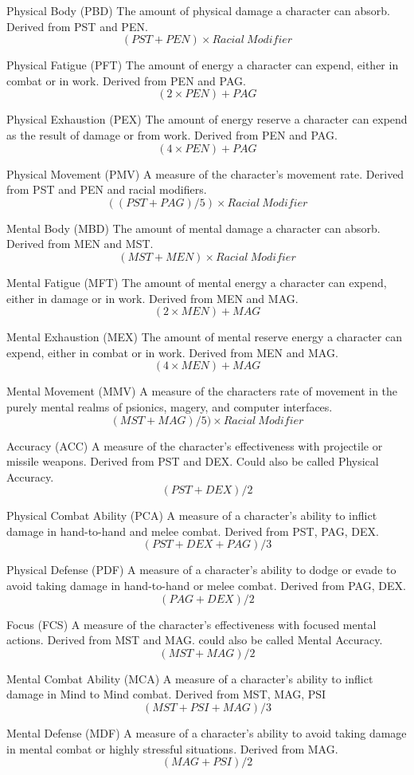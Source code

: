 \begin{relate}
	\item[Physical Body (PBD)]
	The amount of physical damage a character can absorb. Derived from PST
	and PEN.
	\[(PST+PEN) \times {Racial\ Modifier}\]
	\item[Physical Fatigue (PFT)]
	The amount of energy a character can expend, either in combat or in
	work. Derived from PEN and PAG.
	\[(2 \times PEN)+PAG\]
	\item[Physical Exhaustion (PEX)]
	The amount of energy reserve a character can expend as the result of
	damage or from work. Derived from PEN and PAG.
	\[(4 \times PEN)+PAG\]
	\item[Physical Movement (PMV)]
	A measure of the character's movement rate. Derived from PST and 
	PEN and	racial modifiers.
	\[((PST+PAG)/5) \times {Racial\ Modifier}\]
	\item[Mental Body (MBD)]
	The amount of mental damage a character can absorb. Derived from MEN and MST.
	\[(MST+MEN) \times {Racial\ Modifier}\]
	\item[Mental Fatigue (MFT)]
	The amount of mental energy a character can expend, either in damage
	or in work. Derived from MEN and MAG.
	\[(2 \times MEN)+MAG\]
	\item[Mental Exhaustion (MEX)]
	The amount of mental reserve energy a character can expend, either in combat
	or in work. Derived from MEN and MAG.
	\[(4 \times MEN)+MAG\]
	\item[Mental Movement (MMV)]
	A measure of the characters rate of movement in the purely mental
	realms of psionics, magery, and computer interfaces.
	\[(MST+MAG)/5)\times {Racial\ Modifier}\]
	\item[Accuracy (ACC)]
	A measure of the character's effectiveness with projectile or missile
	weapons. Derived from PST and DEX. Could also be called Physical
	Accuracy.
	\[(PST+DEX)/2		  \]
	\item[Physical Combat Ability (PCA)]
	A measure of a character's ability to in\-flict
	dam\-age in hand-to-hand and melee combat. Derived from
	PST, PAG, DEX.
	\[(PST+DEX+PAG)/3 \]
	\item[Physical Defense (PDF)]
	A measure of a character's ability to dodge or evade  to avoid
	taking damage in hand-to-hand or melee combat. Derived
	from PAG, DEX.
	\[(PAG+DEX)/2 \]
	\item[Focus	(FCS)]
	A measure of the character's effectiveness with focused mental
	actions. Derived from MST and MAG. could also be called Mental
	Accuracy.
	\[(MST+MAG)/2 \]
	\item[Mental Combat Ability (MCA)]
	A measure of a character's ability to inflict damage in Mind to Mind
	combat. Derived from MST, MAG, PSI
	\[(MST+PSI+MAG)/3 \]
	\item[Mental Defense (MDF)]
	A measure of a character's ability to avoid taking damage in mental
	combat or highly stressful situations. Derived from MAG.
	\[(MAG+PSI)/2 \]
\end{relate}

